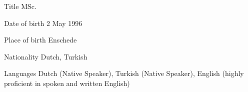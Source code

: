 

\begin{cvskills}

  \cvskill
{Title} %
{MSc.} %

  \cvskill
{Date of birth} %
{2 May 1996} %

  \cvskill
{Place of birth} %
{Enschede} %

  \cvskill
{Nationality} %
{Dutch, Turkish} %

  \cvskill
{Languages} %
{Dutch (Native Speaker), Turkish (Native Speaker), English (highly proficient in spoken and written English)} %



\end{cvskills}